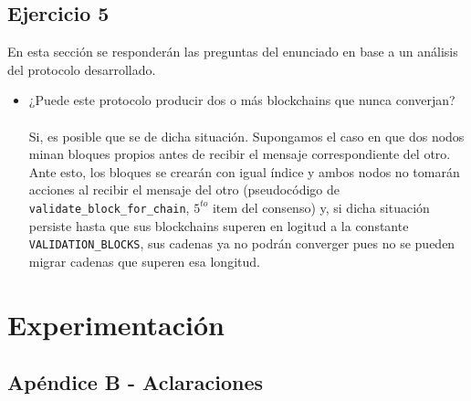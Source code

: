 \documentclass[10pt, a4paper, hidelinks]{article}
\begin{document}
\subsection{Ejercicio 5}
En esta sección se responderán las preguntas del enunciado en base a un análisis del protocolo desarrollado.

\begin{itemize}
    \item ¿Puede este protocolo producir dos o más blockchains que nunca converjan? \\
    \\
    Si, es posible que se de dicha situación. Supongamos el caso en que dos nodos minan bloques propios antes de recibir el mensaje correspondiente del otro. Ante esto, los bloques se crearán con igual índice y ambos nodos no tomarán acciones al recibir el mensaje del otro (pseudocódigo de \texttt{validate\_block\_for\_chain}, $5^{to}$ item del consenso) y, si dicha situación persiste hasta que sus blockchains superen en logitud a la constante \texttt{VALIDATION\_BLOCKS}, sus cadenas ya no podrán converger pues no se pueden migrar cadenas que superen esa longitud.  
\end{itemize}

\section{Experimentación}


\newpage



\subsection{Apéndice B - Aclaraciones}
\end{document}
